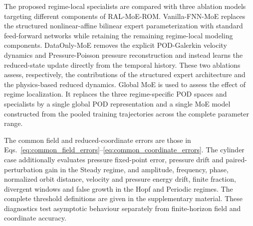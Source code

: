The proposed regime-local specialists are compared with three ablation
models targeting different components of RAL-MoE-ROM. Vanilla-FNN-MoE
replaces the structured nonlinear-affine bilinear expert parameterization
with standard feed-forward networks while retaining the remaining
regime-local modeling components. DataOnly-MoE removes the explicit
POD-Galerkin velocity dynamics and Pressure-Poisson pressure reconstruction
and instead learns the reduced-state update directly from the temporal
history. These two ablations assess, respectively, the contributions of the
structured expert architecture and the physics-based reduced dynamics. Global MoE is used to assess the effect of regime localization. It replaces
the three regime-specific POD spaces and specialists by a single global POD
representation and a single MoE model constructed from the pooled training
trajectories across the complete parameter range. 



The common field and reduced-coordinate errors are those in
Eqs.~\eqref{eq:common_field_errors}--\eqref{eq:common_coordinate_errors}.
The cylinder case additionally evaluates pressure fixed-point error,
pressure drift and paired-perturbation gain in the Steady regime, and
amplitude, frequency, phase, normalized orbit distance, velocity and pressure
energy drift, finite fraction, divergent windows and false growth in the
Hopf and Periodic regimes.  The complete threshold definitions are given in
the supplementary material.  These diagnostics test asymptotic behaviour
separately from finite-horizon field and coordinate accuracy.

